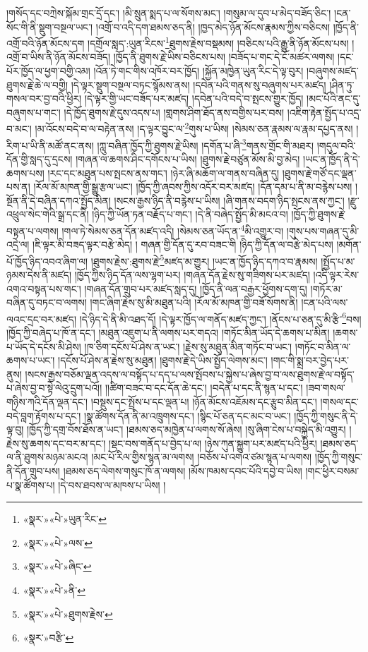 །གསོད་དང་བཀྲེས་སྐོམ་གྲང་དྲོ་དང་། །མི་སྲུན་སྨད་པ་ལ་སོགས་མང་། །གསུམ་ལ་དུབ་པ་མེད་བཟོད་ཅིང་། །ངན་སོང་གི་ནི་སྡུག་བསྔལ་ཡང་། །འགྲོ་བ་འདི་དག་ཐམས་ཅད་ནི། །ཁྱད་མེད་ཉོན་མོངས་རྣམས་ཀྱིས་བཅིངས། །ཁྱོད་ནི་འགྲོ་བའི་ཉོན་མོངས་དག །དགྲོལ་སླད་:ཡུན་རིངས་\footnote{«སྣར་»«པེ་»ཡུན་རིང་}ཐུགས་རྗེས་བསྡམས། །བཅིངས་པའི་རྒྱུ་ནི་ཉོན་མོངས་པས། །འགྲོ་བ་ཡིས་ནི་ཉོན་མོངས་བཟོད། །ཁྱོད་ནི་ཐུགས་རྗེ་ཡིས་བཅིངས་པས། །བཟོད་པ་གང་དེ་ངོ་མཚར་ལགས། །དང་པོར་ཁྱོད་ལ་ཕྱག་བགྱི་འམ། །འོན་ཏེ་གང་གིས་འཁོར་བར་ཁྱོད། །སྐྱོན་མཁྱེན་ཡུན་རིང་དེ་ལྟ་བུར། །བཞུགས་མཛད་ཐུགས་རྗེ་ཆེ་ལ་བགྱི། །དེ་ལྟར་སྡུག་བསྔལ་བཏང་སྙོམས་ནས། །དབེན་པའི་གནས་སུ་བཞུགས་པར་མཛད། །ཤིན་ཏུ་གསལ་བར་བྱ་བའི་ཕྱིར། །དེ་ལྟར་གྱི་ཡང་བཟོད་པར་མཛད། །དབེན་པའི་བདེ་བ་སྤངས་གྱུར་ཁྱོད། །མང་པོའི་ནང་དུ་བཞུགས་པ་གང་། །དེ་ཁྱོད་ཐུགས་རྗེ་དུས་འདས་པ། །གླགས་ཤིག་ཐོད་ནས་བགྱིས་པར་བས། །འཇིག་རྟེན་སྤྱོད་པ་འདྲ་བ་མང་། །མ་འོངས་བདེ་བ་ལ་བརྟེན་ནས། །ད་ལྟར་བྱུང་ལ་\footnote{«སྣར་»«པེ་»ལས་}གུས་པ་ཡིས། །སེམས་ཅན་རྣམས་ལ་རྣམ་དཔྱད་ནས། །རིག་པ་ཡི་ནི་མཚོ་ནང་ནས། །ཀླུ་བཞིན་ཁྱོད་ཀྱི་ཐུགས་རྗེ་ཡིས། །དགོན་པ་ཞི་\footnote{«སྣར་»«པེ་»ཞིང་}གནས་གྲོང་གི་མཐར། །གདུལ་བའི་དོན་གྱི་སླད་དུ་དྲངས། །གཞན་ལ་ཆགས་ཤིང་དགོངས་པ་ཡིས། །ཐུགས་རྗེ་བཙུན་མོས་མི་བྱ་མེད། །ཡང་ན་ཁྱོད་ནི་དེ་ཆགས་པས། །རང་དང་མཐུན་པས་སྤངས་ནས་གང་། །ཉེར་ཞི་མཆོག་ལ་གནས་བཞིན་དུ། །ཐུགས་རྗེ་གཙོ་དང་ལྡན་པས་ན། །རོལ་མོ་མཁན་གྱི་སྒྱུ་རྩལ་ཡང་། །ཁྱོད་ཀྱི་ཞབས་ཀྱིས་འདོར་བར་མཛད། །དོན་དམ་པ་ནི་མ་བརྙེས་པས། །སྔོན་ནི་དེ་བཞིན་དཀའ་སྤྱོད་མིན། །སངས་རྒྱས་ཉིད་ནི་བརྙེས་པ་ཡིས། །ཞི་གནས་བདག་ཉིད་སྤངས་ནས་ཀྱང་། །རྫུ་འཕྲུལ་སེང་གེའི་སྒྲ་དང་ནི། །ཉིད་ཀྱི་ཡོན་ཏན་བརྗོད་པ་གང་། །དེ་ནི་བཞེད་སྤྱོད་མི་མངའ་བ། །ཁྱོད་ཀྱི་ཐུགས་རྗེ་བསྟན་པ་ལགས། །གལ་ཏེ་སེམས་ཅན་དོན་མཛད་འདི། །སེམས་ཅན་ཡོད་ན་\footnote{«སྣར་»«པེ་»ནི་}མི་འགྱུར་བ། །གུས་པས་གཞན་དུ་མི་འདྲེ་ལ། །ཇི་ལྟར་མི་བཟད་ལྟར་བརྩེ་མེད། །
གཞན་གྱི་དོན་དུ་རབ་བཟང་གི །ཉིད་ཀྱི་དོན་ལ་བརྩེ་མེད་པས། །མགོན་པོ་ཁྱོད་ཉིད་འབའ་ཞིག་ལ། །ཐུགས་རྗེས་:ཐུགས་རྗེ་\footnote{«སྣར་»«པེ་»ཐུགས་རྗེས་}མཛད་མ་གྱུར། །ཡང་ན་ཁྱོད་ཉིད་དཀའ་བ་རྣམས། །སྤྱོད་པ་མ་ཉམས་དེས་ནི་མཛད། །ཁྱོད་ཀྱིས་ཉིད་དོན་ལས་ལྷག་པར། །གཞན་དོན་རྗེས་སུ་གཟིགས་པར་མཛད། །འདི་ལྟར་རེས་འགའ་བསྟན་པས་གང་། །གཞན་དོན་གྲུབ་པར་མཛད་སླད་དུ། །ཁྱོད་ནི་ལན་བརྒྱར་ཕྱོགས་དག་དུ། །གཏོར་མ་བཞིན་དུ་བཏང་བ་ལགས། །གང་ཞིག་རྗེས་སུ་མི་མཐུན་པའི། །རོལ་མོ་མཁན་གྱི་བཟོ་སོགས་ནི། །ངན་པའི་ལས་ལའང་དྲང་བར་མཛད། །དེ་ཉིད་དེ་ནི་མི་འཐད་དོ། །དེ་ལྟར་ཁྱོད་ལ་གནོད་མཛད་ཀྱང་། །ནོངས་པ་ཅན་དུ་མི་རྩི་\footnote{«སྣར་»བརྩི་}བས། །ཁྱོད་ཀྱི་བཞེད་པ་ཁོ་ན་དང་། །མཐུན་འཇུག་པ་ནི་ལགས་པར་གདའ། །གཏོང་མིན་ཡོད་དེ་ཆགས་པ་མིན། །ཆགས་པ་ཡོད་དེ་དངོས་མི་ཤེས། །ཁ་ཅིག་དངོས་པོ་ཤེས་ན་ཡང་། །རྗེས་སུ་མཐུན་མིན་གཏོང་བ་ཡང་། །གཏོང་བ་མིན་ལ་ཆགས་པ་ཡང་། །དངོས་པོ་ཤེས་ན་རྗེས་སུ་མཐུན། །ཐུགས་རྗེ་དེ་ཡིས་སྤྱོད་ལེགས་མང་། །གང་གི་སྨྲ་བར་བྱེད་པར་ནུས། །སངས་རྒྱས་བཅོམ་ལྡན་འདས་ལ་བསྟོད་པ་དད་པ་ལས་སྤོབས་པ་སྐྱེས་པ་ཞེས་བྱ་བ་ལས་ཐུགས་རྗེ་ལ་བསྟོད་པ་ཞེས་བྱ་བ་སྟེ་ལེའུ་དྲུག་པའོ།། །།ཚིག་བཟང་བ་དང་དོན་ཆེ་དང་། །བདེན་པ་དང་ནི་སྙན་པ་དང་། །ཟབ་གསལ་གཉིས་ཀའི་དོན་ལྡན་དང་། །བསྡུས་དང་སྤྲོས་པ་དང་ལྡན་པ། །ཉོན་མོངས་འཇོམས་དང་རྩུབ་མིན་དང་། །གསལ་དང་བདེ་བླག་རྟོགས་པ་དང་། །སྣ་ཚོགས་དོན་ནི་མ་འཁྲུགས་དང་། །སྙིང་པོ་ཅན་དང་མང་བ་ཡང་། །ཁྱོད་ཀྱི་གསུང་ནི་དེ་ལྟ་བུ། །ཁྱོད་ཀྱི་དགྲ་བོས་ཐོས་ན་ཡང་། །ཐམས་ཅད་མཁྱེན་པ་ལགས་སོ་ཞེས། །སུ་ཞིག་ངེས་པ་བསྐྱེད་མི་འགྱུར། །རྗེས་སུ་ཆགས་དང་བར་མ་དང་། །སྡང་བས་གནོད་པ་བྱེད་པ་ལ། །ཉེས་ཀུན་སྐྱུག་པར་མཛད་པའི་ཕྱིར། །ཐམས་ཅད་ལ་ནི་ཐུགས་མཉམ་མངའ། །མང་པོ་རིལ་གྱིས་སྙན་མ་ལགས། །བཅོས་པ་འགའ་ཙམ་སྙན་པ་ལགས། །ཁྱོད་ཀྱི་གསུང་ནི་དོན་གྲུབ་པས། །ཐམས་ཅད་ལེགས་གསུང་ཁོ་ན་ལགས། །མོས་ཁམས་དབང་པོའི་དབྱེ་བ་ཡིས། །གང་ཕྱིར་བསམ་པ་སྣ་ཚོགས་པ། །དེ་བས་ཐབས་ལ་མཁས་པ་ཡིས། །
